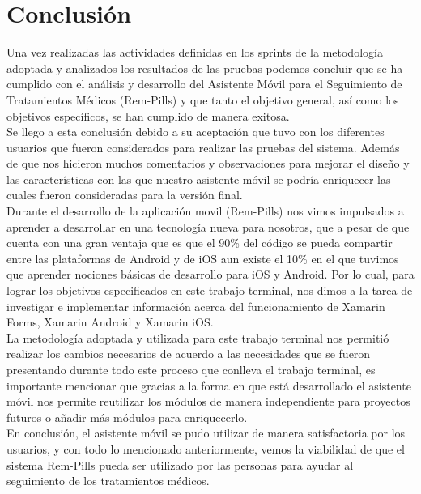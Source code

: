 \newpage
\section{Conclusión}

Una vez realizadas las actividades definidas en los sprints de la metodología adoptada y analizados los resultados de las pruebas podemos concluir que se ha cumplido con el análisis y desarrollo del Asistente Móvil para el Seguimiento de Tratamientos Médicos (Rem-Pills) y que tanto el objetivo general, así como los objetivos específicos, se han cumplido de manera exitosa.\\

Se llego a esta conclusión debido a su aceptación que tuvo con los diferentes usuarios que fueron considerados para realizar las pruebas del sistema. Además de que nos hicieron muchos comentarios y observaciones para mejorar el diseño y las características con las que nuestro asistente móvil se podría enriquecer las cuales fueron consideradas para la versión final.\\

Durante el desarrollo de la aplicación movil (Rem-Pills) nos vimos impulsados a aprender a desarrollar en una tecnología nueva para nosotros, que a pesar de que cuenta con una gran ventaja que es que el 90\% del código se pueda compartir entre las plataformas de Android y de iOS aun existe el 10\% en el que tuvimos que aprender nociones básicas de desarrollo para iOS y Android. Por lo cual, para lograr los objetivos especificados en este trabajo terminal, nos dimos a la tarea de investigar e implementar información acerca del funcionamiento de Xamarin Forms, Xamarin Android y Xamarin iOS.\\


La metodología adoptada y utilizada para este trabajo terminal nos permitió realizar los cambios necesarios de acuerdo a las necesidades que se fueron presentando durante todo este proceso que conlleva el trabajo terminal, es importante mencionar que gracias a la forma en que está desarrollado el asistente móvil nos permite reutilizar los módulos de manera independiente para proyectos futuros o añadir más módulos para enriquecerlo.\\

En conclusión, el asistente móvil se pudo utilizar de manera satisfactoria por los usuarios, y con todo lo mencionado anteriormente, vemos la viabilidad de que el sistema Rem-Pills pueda ser utilizado por las personas para ayudar al seguimiento de los tratamientos médicos.





